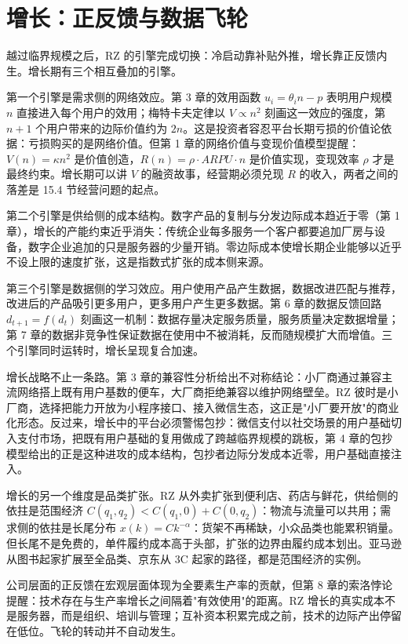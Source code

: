 \section{增长：正反馈与数据飞轮}

越过临界规模之后，RZ 的引擎完成切换：冷启动靠补贴外推，增长靠正反馈内生。增长期有三个相互叠加的引擎。

第一个引擎是需求侧的网络效应。第 3 章的效用函数 $u_i=\theta_i n-p$ 表明用户规模 $n$ 直接进入每个用户的效用；梅特卡夫定律以 $V\propto n^2$ 刻画这一效应的强度，第 $n+1$ 个用户带来的边际价值约为 $2n$。这是投资者容忍平台长期亏损的价值论依据：亏损购买的是网络价值。但第 1 章的网络价值与变现价值模型提醒：$V(n)=\kappa n^2$ 是价值创造，$R(n)=\rho\cdot ARPU\cdot n$ 是价值实现，变现效率 $\rho$ 才是最终约束。增长期可以讲 $V$ 的融资故事，经营期必须兑现 $R$ 的收入，两者之间的落差是 15.4 节经营问题的起点。

第二个引擎是供给侧的成本结构。数字产品的复制与分发边际成本趋近于零（第 1 章），增长的产能约束近乎消失：传统企业每多服务一个客户都要追加厂房与设备，数字企业追加的只是服务器的少量开销。零边际成本使增长期企业能够以近乎不设上限的速度扩张，这是指数式扩张的成本侧来源。

第三个引擎是数据侧的学习效应。用户使用产品产生数据，数据改进匹配与推荐，改进后的产品吸引更多用户，更多用户产生更多数据。第 6 章的数据反馈回路 $d_{t+1}=f(d_t)$ 刻画这一机制：数据存量决定服务质量，服务质量决定数据增量；第 7 章的数据非竞争性保证数据在使用中不被消耗，反而随规模扩大而增值。三个引擎同时运转时，增长呈现复合加速。

增长战略不止一条路。第 3 章的兼容性分析给出不对称结论：小厂商通过兼容主流网络搭上既有用户基数的便车，大厂商拒绝兼容以维护网络壁垒。RZ 彼时是小厂商，选择把能力开放为小程序接口、接入微信生态，这正是"小厂要开放"的商业化形态。反过来，增长中的平台必须警惕包抄：微信支付以社交场景的用户基础切入支付市场，把既有用户基础的复用做成了跨越临界规模的跳板，第 4 章的包抄模型给出的正是这种进攻的成本结构，包抄者边际分发成本近零，用户基础直接注入。

增长的另一个维度是品类扩张。RZ 从外卖扩张到便利店、药店与鲜花，供给侧的依拄是范围经济 $C(q_1,q_2)<C(q_1,0)+C(0,q_2)$：物流与流量可以共用；需求侧的依拄是长尾分布 $x(k)=Ck^{-\alpha}$：货架不再稀缺，小众品类也能累积销量。但长尾不是免费的，单件履约成本高于头部，扩张的边界由履约成本划出。亚马逊从图书起家扩展至全品类、京东从 3C 起家的路径，都是范围经济的实例。

公司层面的正反馈在宏观层面体现为全要素生产率的贡献，但第 8 章的索洛悖论提醒：技术存在与生产率增长之间隔着"有效使用"的距离。RZ 增长的真实成本不是服务器，而是组织、培训与管理；互补资本积累完成之前，技术的边际产出停留在低位。飞轮的转动并不自动发生。

